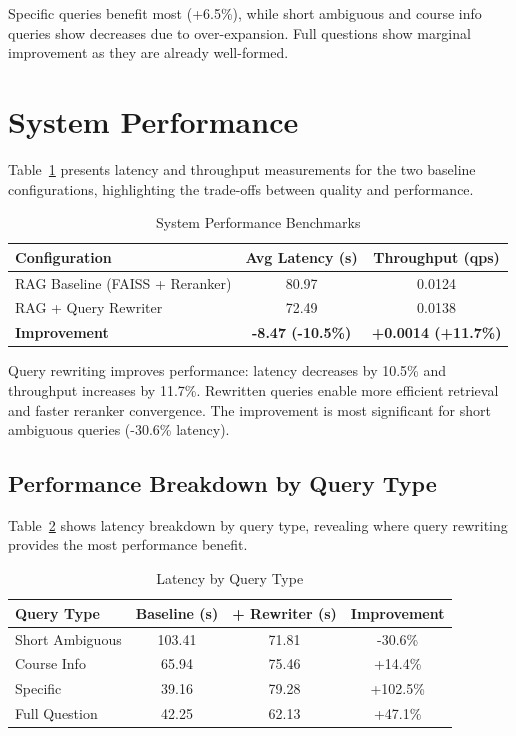 Specific queries benefit most (+6.5\%), while short ambiguous and course info queries show decreases due to over-expansion. Full questions show marginal improvement as they are already well-formed.

\section{System Performance}

Table~\ref{tab:performance} presents latency and throughput measurements for the two baseline configurations, highlighting the trade-offs between quality and performance.

\begin{table}[htbp]
\centering
\caption{System Performance Benchmarks}
\label{tab:performance}
\begin{tabular}{|l|c|c|}
\hline
\textbf{Configuration} & \textbf{Avg Latency (s)} & \textbf{Throughput (qps)} \\
\hline
RAG Baseline (FAISS + Reranker) & 80.97 & 0.0124 \\
\hline
RAG + Query Rewriter & 72.49 & 0.0138 \\
\hline
\textbf{Improvement} & \textbf{-8.47 (-10.5\%)} & \textbf{+0.0014 (+11.7\%)} \\
\hline
\end{tabular}
\end{table}

Query rewriting improves performance: latency decreases by 10.5\% and throughput increases by 11.7\%. Rewritten queries enable more efficient retrieval and faster reranker convergence. The improvement is most significant for short ambiguous queries (-30.6\% latency).

\subsection{Performance Breakdown by Query Type}

Table~\ref{tab:performance_by_type} shows latency breakdown by query type, revealing where query rewriting provides the most performance benefit.

\begin{table}[htbp]
\centering
\caption{Latency by Query Type}
\label{tab:performance_by_type}
\begin{tabular}{|l|c|c|c|}
\hline
\textbf{Query Type} & \textbf{Baseline (s)} & \textbf{+ Rewriter (s)} & \textbf{Improvement} \\
\hline
Short Ambiguous & 103.41 & 71.81 & -30.6\% \\
\hline
Course Info & 65.94 & 75.46 & +14.4\% \\
\hline
Specific & 39.16 & 79.28 & +102.5\% \\
\hline
Full Question & 42.25 & 62.13 & +47.1\% \\
\hline
\end{tabular}
\end{table}


